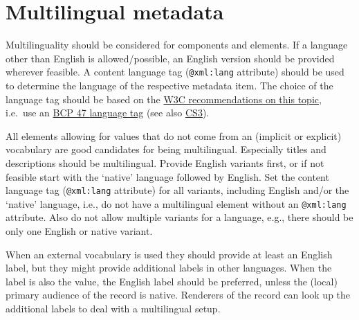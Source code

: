 \section{Multilingual metadata}\label{multilingual-metadata}

Multilinguality should be considered for components and elements. If a language other than English is allowed/possible, an English version should be provided wherever feasible. A content language tag (\texttt{@xml:lang} attribute) should be used to determine the language of the respective metadata item. The choice of the language tag should be based on the
\href{https://www.w3.org/International/questions/qa-choosing-language-tags}{W3C recommendations on this topic}, i.e.~use an
\href{https://tools.ietf.org/rfc/bcp/bcp47.txt}{BCP 47 \cite{bcp47}}
\href{https://www.iana.org/assignments/language-subtag-registry/language-subtag-registry}{language
tag} (see also \hyperref[cs3]{CS3}).

All elements allowing for values that do not come from an (implicit or explicit) vocabulary are good candidates for being multilingual. Especially titles and descriptions should be multilingual. Provide English variants first, or if not feasible start with the `native' language followed by English. Set the content language tag (\texttt{@xml:lang} attribute) for all variants, including English and/or the `native' language, i.e., do not have a multilingual element without an \texttt{@xml:lang} attribute. Also do not allow multiple
variants for a language, e.g., there should be only one English or native variant.

When an external vocabulary is used they should provide at least an English label, but they might provide additional labels in other languages. When the label is also the value, the English label should be preferred, unless the (local) primary audience of the record is native. Renderers of the record can look up the additional labels to deal with a
multilingual setup.

